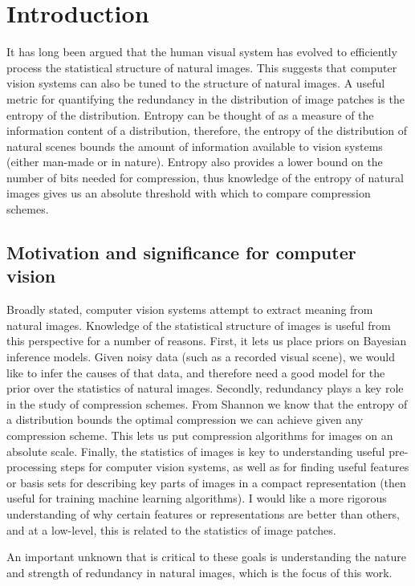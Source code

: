 \documentclass[10pt,twocolumn,letterpaper]{article}
\begin{document}
\section{Introduction}
It has long been argued \cite{barlow} that the human visual system has evolved to efficiently process the statistical structure of natural images. This suggests that computer vision systems can also be tuned to the structure of natural images. A useful metric for quantifying the redundancy in the distribution of image patches is the entropy of the distribution. Entropy can be thought of as a measure of the information content of a distribution, therefore, the entropy of the distribution of natural scenes bounds the amount of information available to vision systems (either man-made or in nature). Entropy also provides a lower bound on the number of bits needed for compression, thus knowledge of the entropy of natural images gives us an absolute threshold with which to compare compression schemes.

\subsection{Motivation and significance for computer vision}
Broadly stated, computer vision systems attempt to extract meaning from natural images.
Knowledge of the statistical structure of images is useful from this perspective for a number of reasons.
First, it lets us place priors on Bayesian inference models. Given noisy data (such as a recorded visual scene), we would like to infer the causes of that data, and therefore need a good model for the prior over the statistics of natural images.
Secondly, redundancy plays a key role in the study of compression schemes. From Shannon we know that the entropy of a distribution bounds the optimal compression we can achieve given any compression scheme. This lets us put compression algorithms for images on an absolute scale.
Finally, the statistics of images is key to understanding useful pre-processing steps for computer vision systems, as well as for finding useful features or basis sets for describing key parts of images in a compact representation (then useful for training machine learning algorithms).
I would like a more rigorous understanding of why certain features or representations are better than others, and at a low-level, this is related to the statistics of image patches.

An important unknown that is critical to these goals is understanding the nature and strength of redundancy in natural images, which is the focus of this work.
\end{document}
